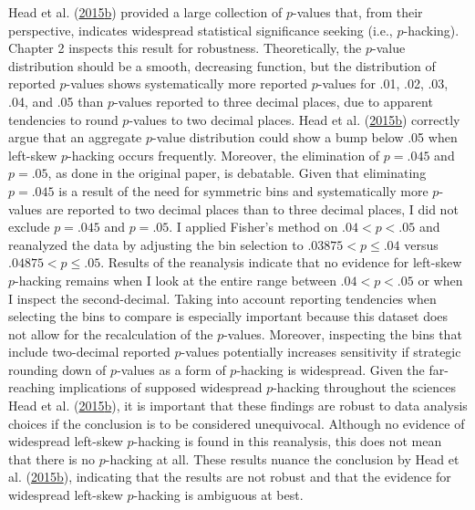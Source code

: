 \documentclass[a5paper]{book}
\begin{document}
Head et al.
(\protect\hyperlink{ref-doi:10.1371ux2fjournal.pbio.1002106}{2015}\protect\hyperlink{ref-doi:10.1371ux2fjournal.pbio.1002106}{b})
provided a large collection of \(p\)-values that, from their
perspective, indicates widespread statistical significance seeking
(i.e., \(p\)-hacking). Chapter 2 inspects this result for robustness.
Theoretically, the \(p\)-value distribution should be a smooth,
decreasing function, but the distribution of reported \(p\)-values shows
systematically more reported \(p\)-values for .01, .02, .03, .04, and
.05 than \(p\)-values reported to three decimal places, due to apparent
tendencies to round \(p\)-values to two decimal places. Head et al.
(\protect\hyperlink{ref-doi:10.1371ux2fjournal.pbio.1002106}{2015}\protect\hyperlink{ref-doi:10.1371ux2fjournal.pbio.1002106}{b})
correctly argue that an aggregate \(p\)-value distribution could show a
bump below .05 when left-skew \(p\)-hacking occurs frequently. Moreover,
the elimination of \(p=.045\) and \(p=.05\), as done in the original
paper, is debatable. Given that eliminating \(p=.045\) is a result of
the need for symmetric bins and systematically more \(p\)-values are
reported to two decimal places than to three decimal places, I did not
exclude \(p=.045\) and \(p=.05\). I applied Fisher's method on
\(.04<p<.05\) and reanalyzed the data by adjusting the bin selection to
\(.03875<p\leq.04\) versus \(.04875<p\leq.05\). Results of the
reanalysis indicate that no evidence for left-skew \(p\)-hacking remains
when I look at the entire range between \(.04<p<.05\) or when I inspect
the second-decimal. Taking into account reporting tendencies when
selecting the bins to compare is especially important because this
dataset does not allow for the recalculation of the \(p\)-values.
Moreover, inspecting the bins that include two-decimal reported
\(p\)-values potentially increases sensitivity if strategic rounding
down of \(p\)-values as a form of \(p\)-hacking is widespread. Given the
far-reaching implications of supposed widespread \(p\)-hacking
throughout the sciences Head et al.
(\protect\hyperlink{ref-doi:10.1371ux2fjournal.pbio.1002106}{2015}\protect\hyperlink{ref-doi:10.1371ux2fjournal.pbio.1002106}{b}),
it is important that these findings are robust to data analysis choices
if the conclusion is to be considered unequivocal. Although no evidence
of widespread left-skew \(p\)-hacking is found in this reanalysis, this
does not mean that there is no \(p\)-hacking at all. These results
nuance the conclusion by Head et al.
(\protect\hyperlink{ref-doi:10.1371ux2fjournal.pbio.1002106}{2015}\protect\hyperlink{ref-doi:10.1371ux2fjournal.pbio.1002106}{b}),
indicating that the results are not robust and that the evidence for
widespread left-skew \(p\)-hacking is ambiguous at best.
\end{document}
